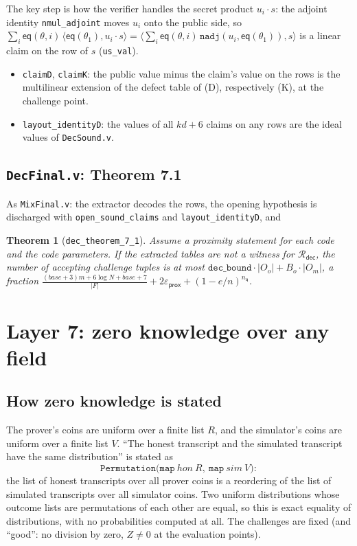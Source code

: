 \documentclass[11pt,a4paper]{article}
\newcommand{\eq}{\mathsf{eq}}
\newcommand{\Rdec}{\mathcal{R}_{\mathsf{dec}}}
\newcommand{\ip}[2]{\langle #1, #2\rangle}
\newcommand{\epsprox}{\varepsilon_{\mathsf{prox}}}
\newcommand{\nq}{n_{\mathsf{q}}}
\theoremstyle{definition}
\theoremstyle{plain}
\newtheorem{theorem}[definition]{Theorem}
\begin{document}
The key step is how the verifier handles the secret product $u_i\cdot s$: the adjoint identity
\texttt{nmul\_adjoint} moves $u_i$ onto the public side, so
$\sum_i\eq(\theta,i)\,\ip{\eq(\theta_1)}{u_i\cdot s}=\ip{\sum_i\eq(\theta,i)\,\mathtt{nadj}(u_i,\eq(\theta_1))}{s}$
is a linear claim on the row of $s$ (\texttt{us\_val}).
\begin{itemize}[leftmargin=1.3em]
\item \texttt{claimD}, \texttt{claimK}: the public value minus the claim's value on the rows is the
  multilinear extension of the defect table of (D), respectively (K), at the challenge point.
\item \texttt{layout\_identityD}: the values of all $kd+6$ claims on any rows are the ideal values
  of \texttt{DecSound.v}.
\end{itemize}

\subsection{\texttt{DecFinal.v}: Theorem 7.1}

As \texttt{MixFinal.v}: the extractor decodes the rows, the opening hypothesis is discharged with
\texttt{open\_sound\_claims} and \texttt{layout\_identityD}, and
\begin{theorem}[\texttt{dec\_theorem\_7\_1}]
Assume a proximity statement for each code and the code parameters. If the extracted tables are not
a witness for $\Rdec$, the number of accepting challenge tuples is at most
$\mathtt{dec\_bound}\cdot|O_o|+B_o\cdot|O_m|$, a fraction
$\frac{(\mathit{base}+3)m+6\log N+\mathit{base}+7}{|F|}+2\epsprox+(1-e/n)^{\nq}$.
\end{theorem}

\section{Layer 7: zero knowledge over any field}
\label{sec:fm-zk}

\subsection{How zero knowledge is stated}

The prover's coins are uniform over a finite list $R$, and the simulator's coins are uniform over a
finite list $V$. ``The honest transcript and the simulated transcript have the same distribution''
is stated as
\[
  \mathtt{Permutation}\bigl(\mathtt{map}\ \mathit{hon}\ R,\ \mathtt{map}\ \mathit{sim}\ V\bigr):
\]
the list of honest transcripts over all prover coins is a reordering of the list of simulated
transcripts over all simulator coins. Two uniform distributions whose outcome lists are
permutations of each other are equal, so this is exact equality of distributions, with no
probabilities computed at all. The challenges are fixed (and ``good'': no division by zero, $Z\ne0$
at the evaluation points).
\end{document}

